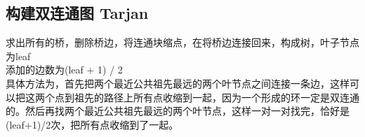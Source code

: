 \subsection{构建双连通图 Tarjan}
求出所有的桥，删除桥边，将连通块缩点，在将桥边连接回来，构成树，叶子节点为leaf\\
添加的边数为(leaf + 1) / 2\\
具体方法为，首先把两个最近公共祖先最远的两个叶节点之间连接一条边，这样可以把这两个点到祖先的路径上所有点收缩到一起，因为一个形成的环一定是双连通的。然后再找两个最近公共祖先最远的两个叶节点，这样一对一对找完，恰好是(leaf+1)/2次，把所有点收缩到了一起。

